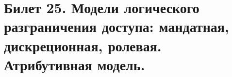 \newpage
\section {Билет 25. Модели логического разграничения доступа: мандатная, дискреционная, ролевая. Атрибутивная модель.}